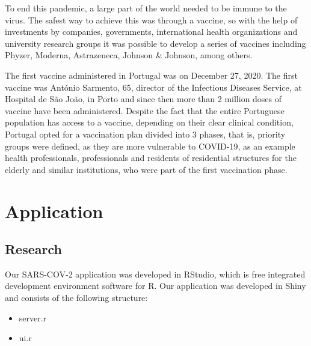 \documentclass[11pt,a4paper]{report}
\begin{document}
   To end this pandemic, a large part of the world needed to be immune to the virus. The safest way to achieve this was through a vaccine, so with the help of investments by companies, governments, international health organizations and university research groups it was possible to develop a series of vaccines including Phyzer, Moderna, Astrazeneca, Johnson & Johnson, among others.

   The first vaccine administered in Portugal was on December 27, 2020. The first vaccine was António Sarmento, 65, director of the Infectious Diseases Service, at Hospital de São João, in Porto and since then more than 2 million doses of vaccine have been administered. Despite the fact that the entire Portuguese population has access to a vaccine, depending on their clear clinical condition, Portugal opted for a vaccination plan divided into 3 phases, that is, priority groups were defined, as they are more vulnerable to COVID-19, as an example health professionals, professionals and residents of residential structures for the elderly and similar institutions, who were part of the first vaccination phase.


\chapter{Application}




\section{Research}
Our SARS-COV-2 application was developed in RStudio, which is free integrated development environment software for R. Our application was developed in Shiny and consists of the following structure:

\begin{itemize}
    \item server.r
    \item ui.r
    
\end{itemize}
 
\end{document}
